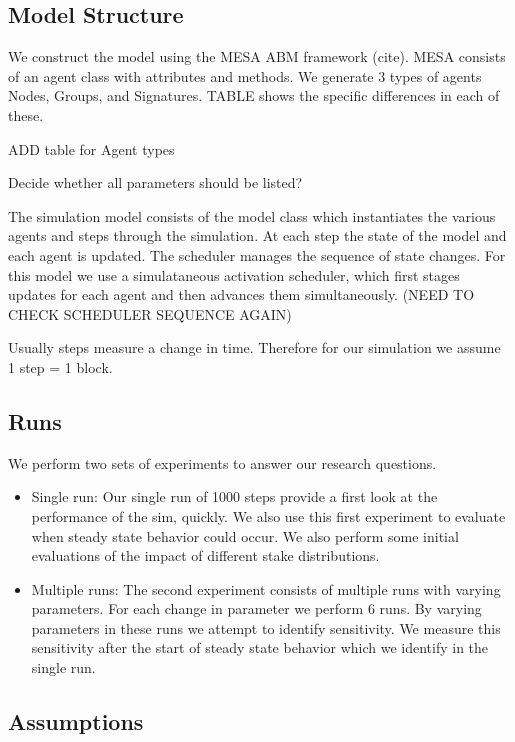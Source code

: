 \documentclass[conference]{IEEEtran}
\begin{document}
\subsection{Model Structure}
We construct the model using the MESA ABM framework (cite). MESA consists of an agent class with
attributes and methods. We generate 3 types of agents Nodes, Groups, and Signatures. TABLE shows 
the specific differences in each of these.

ADD table for Agent types


Decide whether all parameters should be listed?


The simulation model consists of the model class which instantiates the various agents
and steps through the simulation. At each step the state of the model and each agent
is updated. The scheduler manages the sequence of state changes. For this model we use
a simulataneous activation scheduler, which first stages updates for each agent and then 
advances them simultaneously.  (NEED TO CHECK SCHEDULER SEQUENCE AGAIN)

Usually steps measure a change in time. Therefore for our simulation we assume
1 step = 1 block.

\subsection{Runs}
We perform two sets of experiments to answer our research questions. 
\begin{itemize}

\item Single run: Our single run of 1000 steps provide a first look at the 
performance of the sim, quickly. We also use this first experiment to evaluate
when steady state behavior could occur. We also perform some initial evaluations
of the impact of different stake distributions.

\item Multiple runs: The second experiment consists of multiple runs with varying 
parameters. For each change in parameter we perform 6 runs. By varying parameters 
in these runs we attempt to identify sensitivity. We measure this sensitivity after
the start of steady state behavior which we identify in the single run. 
    
\end{itemize}

\subsection{Assumptions}
\end{document}
